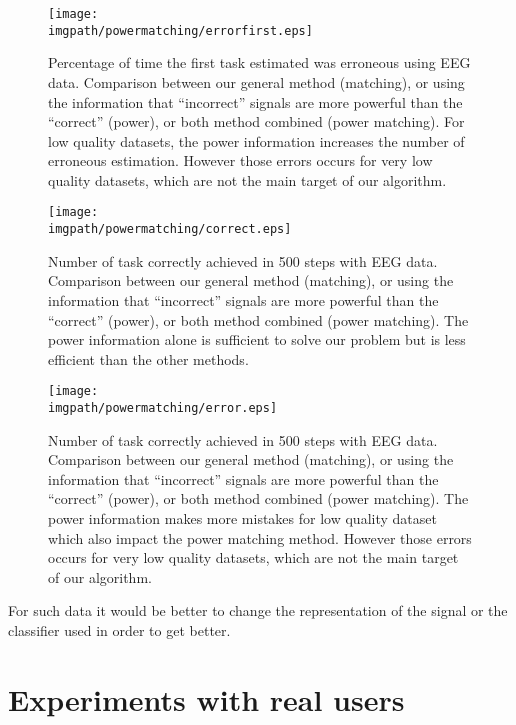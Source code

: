 \begin{figure}[!ht]
\centering
\texttt{[image: \\imgpath/powermatching/errorfirst.eps]}
\caption{Percentage of time the first task estimated was erroneous using EEG data. Comparison between our general method (matching), or using the information that ``incorrect'' signals are more powerful than the ``correct'' (power), or both method combined (power matching). For low quality datasets, the power information increases the number of erroneous estimation. However those errors occurs for very low quality datasets, which are not the main target of our algorithm.}
\label{fig:errorfirst_powermatching}
\end{figure} 


\begin{figure}[!ht]
\centering
\texttt{[image: \\imgpath/powermatching/correct.eps]}
\caption{Number of task correctly achieved in 500 steps with EEG data. Comparison between our general method (matching), or using the information that ``incorrect'' signals are more powerful than the ``correct'' (power), or both method combined (power matching). The power information alone is sufficient to solve our problem but is less efficient than the other methods.}
\label{fig:nCorrect_powermatching}
\end{figure} 

\begin{figure}[!ht]
\centering
\texttt{[image: \\imgpath/powermatching/error.eps]}
\caption{Number of task correctly achieved in 500 steps with EEG data. Comparison between our general method (matching), or using the information that ``incorrect'' signals are more powerful than the ``correct'' (power), or both method combined (power matching). The power information makes more mistakes for low quality dataset which also impact the power matching method. However those errors occurs for very low quality datasets, which are not the main target of our algorithm.}
\label{fig:nWrongEEG_powermatching}
\end{figure} 

For such data it would be better to change the representation of the signal or the classifier used in order to get better.

\section{Experiments with real users}

